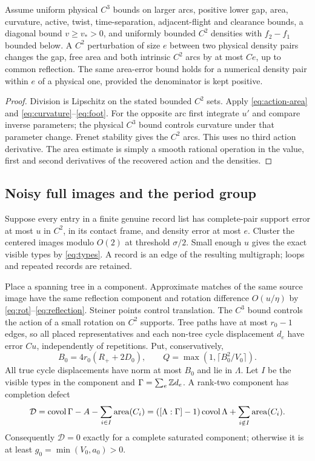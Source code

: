 \begin{proposition}\label{prop:local-inverse}
Assume uniform physical $C^3$ bounds on larger arcs, positive lower gap,
area, curvature, active, twist, time-separation, adjacent-flight and
clearance bounds, a diagonal bound $v\ge v_*>0$, and uniformly bounded
$C^2$ densities with $f_2-f_1$ bounded below. A $C^2$ perturbation of
size $e$ between two physical density pairs changes the gap, free area
and both intrinsic $C^2$ arcs by at most $Ce$, up to common reflection.
The same area-error bound holds for a numerical density pair within $e$
of a physical one, provided the denominator is kept positive.
\end{proposition}
\begin{proof}
Division is Lipschitz on the stated bounded $C^2$ sets. Apply
\eqref{eq:action-area} and \eqref{eq:curvature}--\eqref{eq:foot}.
For the opposite arc first integrate $u'$ and compare inverse parameters;
the physical $C^3$ bound controls curvature under that parameter change.
Frenet stability gives the $C^2$ arcs. This uses no third action derivative.
The area estimate is simply a smooth rational operation in the value,
first and second derivatives of the recovered action and the densities.
\end{proof}

\subsection{Noisy full images and the period group}
Suppose every entry in a finite genuine record list has complete-pair
support error at most $u$ in $C^2$, in its contact frame, and density
error at most $e$. Cluster the centered images modulo $O(2)$ at threshold
$\sigma/2$. Small enough $u$ gives the exact visible types by
\eqref{eq:types}. A record is an edge of the resulting multigraph;
loops and repeated records are retained.

Place a spanning tree in a component. Approximate matches of the same
source image have the same reflection component and rotation difference
$O(u/\eta)$ by \eqref{eq:rot}--\eqref{eq:reflection}. Steiner points
control translation. The $C^3$ bound controls the action of a small
rotation on $C^2$ supports. Tree paths have at most $r_0-1$ edges, so
all placed representatives and each non-tree cycle displacement $d_e$
have error $C u$, independently of repetitions. Put, conservatively,
\[
 B_0=4r_0(R_++2D_0),\qquad Q=\max(1,\lceil B_0^2/V_0\rceil).
\]
All true cycle displacements have norm at most $B_0$ and lie in $\Lambda$.
Let $I$ be the visible types in the component and
$\Gamma=\sum_e\mathbb Z d_e$. A rank-two component has completion defect
\begin{equation}\label{eq:defect}
 \mathcal D=\operatorname{covol}\Gamma-A-\sum_{i\in I}\operatorname{area}(C_i)
 =([\Lambda:\Gamma]-1)\operatorname{covol}\Lambda+
                         \sum_{i\notin I}\operatorname{area}(C_i).
\end{equation}
Consequently $\mathcal D=0$ exactly for a complete saturated component;
otherwise it is at least $g_0=\min(V_0,a_0)>0$.

